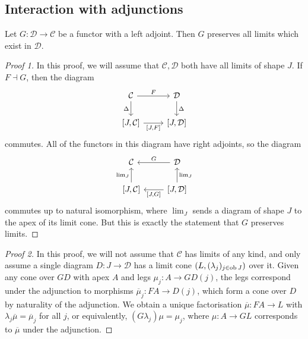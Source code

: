\subsection{Interaction with adjunctions}
\begin{lemma}
    Let \( G : \mathcal D \to \mathcal C \) be a functor with a left adjoint.
    Then \( G \) preserves all limits which exist in \( \mathcal D \).
\end{lemma}
\begin{proof}[Proof 1]
    In this proof, we will assume that \( \mathcal C, \mathcal D \) both have all limits of shape \( J \).
    If \( F \dashv G \), then the diagram
\[\begin{tikzcd}
	{\mathcal C} & {\mathcal D} \\
	{[J, \mathcal C]} & {[J, \mathcal D]}
	\arrow["F", from=1-1, to=1-2]
	\arrow["\Delta"', from=1-1, to=2-1]
	\arrow["\Delta", from=1-2, to=2-2]
	\arrow["{[J,F]}"', from=2-1, to=2-2]
\end{tikzcd}\]
    commutes.
    All of the functors in this diagram have right adjoints, so the diagram
\[\begin{tikzcd}
	{\mathcal C} & {\mathcal D} \\
	{[J, \mathcal C]} & {[J, \mathcal D]}
	\arrow["{\lim_J}"', from=2-2, to=1-2]
	\arrow["G"', from=1-2, to=1-1]
	\arrow["{[J, G]}", from=2-2, to=2-1]
	\arrow["{\lim_J}", from=2-1, to=1-1]
\end{tikzcd}\]
    commutes up to natural isomorphism, where \( \lim_J \) sends a diagram of shape \( J \) to the apex of its limit cone.
    But this is exactly the statement that \( G \) preserves limits.
\end{proof}
\begin{proof}[Proof 2]
    In this proof, we will not assume that \( \mathcal C \) has limits of any kind, and only assume a single diagram \( D : J \to \mathcal D \) has a limit cone \( (L, (\lambda_j)_{j \in \operatorname{ob} J}) \) over it.
    Given any cone over \( GD \) with apex \( A \) and legs \( \mu_j : A \to GD(j) \), the legs correspond under the adjunction to morphisms \( \overline \mu_j : FA \to D(j) \), which form a cone over \( D \) by naturality of the adjunction.
    We obtain a unique factorisation \( \overline \mu : FA \to L \) with \( \lambda_j \overline \mu = \overline \mu_j \) for all \( j \), or equivalently, \( (G\lambda_j)\mu = \mu_j \), where \( \mu : A \to GL \) corresponds to \( \overline \mu \) under the adjunction.
\end{proof}
